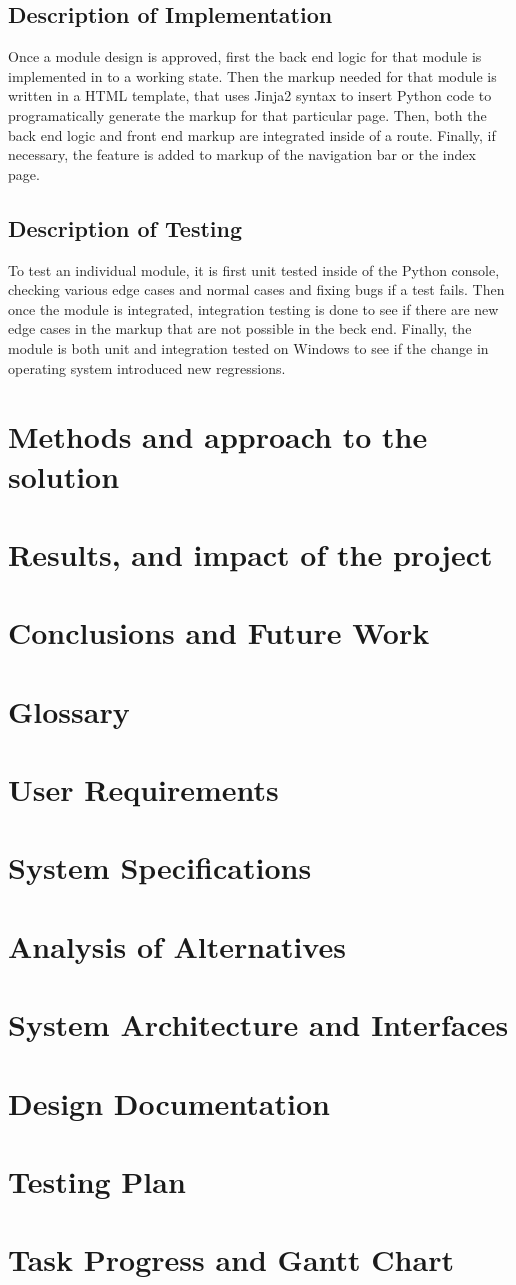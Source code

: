 \documentclass[12pt]{article}
\begin{document}
\subsection{Description of Implementation}
Once a module design is approved, first the back end logic for that module is implemented in to a working state. Then the markup needed for that module is written in a HTML template, that uses Jinja2 syntax to insert Python code to programatically generate the markup for that particular page. Then, both the back end logic and front end markup are integrated inside of a route. Finally, if necessary, the feature is added to markup of the navigation bar or the index page.
\subsection{Description of Testing}
To test an individual module, it is first unit tested inside of the Python console, checking various edge cases and normal cases and fixing bugs if a test fails. Then once the module is integrated, integration testing is done to see if there are new edge cases in the markup that are not possible in the beck end. Finally, the module is both unit and integration tested on Windows to see if the change in operating system introduced new regressions.
\section{Methods and approach to the solution}
\section{Results, and impact of the project}
\section{Conclusions and Future Work}


\appendix
\section{Glossary}
\section{User Requirements}
\section{System Specifications}
\section{Analysis of Alternatives}
\section{System Architecture and Interfaces}
\section{Design Documentation}
\section{Testing Plan}
\section{Task Progress and Gantt Chart}
\end{document}
